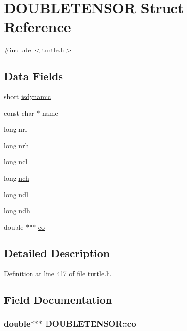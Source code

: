 \hypertarget{struct_d_o_u_b_l_e_t_e_n_s_o_r}{\section{D\-O\-U\-B\-L\-E\-T\-E\-N\-S\-O\-R Struct Reference}
\label{struct_d_o_u_b_l_e_t_e_n_s_o_r}
}


{\ttfamily \#include $<$turtle.\-h$>$}

\subsection*{Data Fields}
\begin{DoxyCompactItemize}
\item 
short \hyperlink{struct_d_o_u_b_l_e_t_e_n_s_o_r_a3ea231d38f5aeff822353461622d891d}{isdynamic}
\item 
const char $\ast$ \hyperlink{struct_d_o_u_b_l_e_t_e_n_s_o_r_a01ca6ab74ced24c95b59fce620a1ed52}{name}
\item 
long \hyperlink{struct_d_o_u_b_l_e_t_e_n_s_o_r_ae087e4712109d06b6e44e5d7d4fbe9ea}{nrl}
\item 
long \hyperlink{struct_d_o_u_b_l_e_t_e_n_s_o_r_af053133b77c45040387cfd381c88e54b}{nrh}
\item 
long \hyperlink{struct_d_o_u_b_l_e_t_e_n_s_o_r_a4eeb67eb095aa0f1fbe1f3942a3cb9d9}{ncl}
\item 
long \hyperlink{struct_d_o_u_b_l_e_t_e_n_s_o_r_a1db8a36e26596f955bdd27c459ae7052}{nch}
\item 
long \hyperlink{struct_d_o_u_b_l_e_t_e_n_s_o_r_a70f655fffb0694e9cc4f63c54c0fead6}{ndl}
\item 
long \hyperlink{struct_d_o_u_b_l_e_t_e_n_s_o_r_a5c2827aa2583196e3b29f49f38af74d9}{ndh}
\item 
double $\ast$$\ast$$\ast$ \hyperlink{struct_d_o_u_b_l_e_t_e_n_s_o_r_a7056e71857c487f2cfc4f23dd1847a99}{co}
\end{DoxyCompactItemize}


\subsection{Detailed Description}


Definition at line 417 of file turtle.\-h.



\subsection{Field Documentation}
\hypertarget{struct_d_o_u_b_l_e_t_e_n_s_o_r_a7056e71857c487f2cfc4f23dd1847a99}{
\subsubsection[{co}]{\setlength{\rightskip}{0pt plus 5cm}double$\ast$$\ast$$\ast$ D\-O\-U\-B\-L\-E\-T\-E\-N\-S\-O\-R\-::co}}\label{struct_d_o_u_b_l_e_t_e_n_s_o_r_a7056e71857c487f2cfc4f23dd1847a99}


